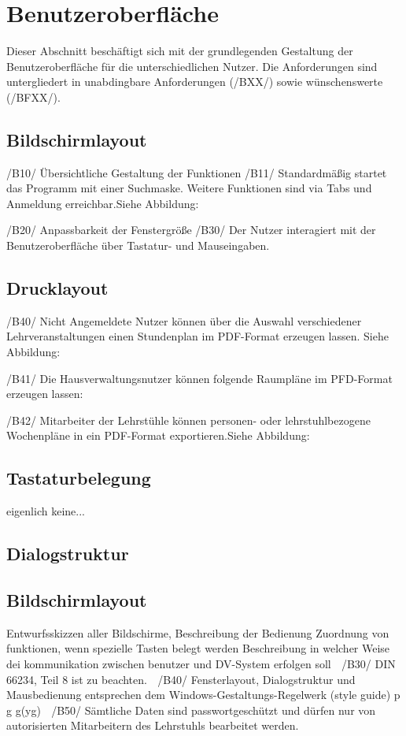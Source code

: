 \section{Benutzeroberfläche}
\label{sec:Benutzeroberfläche}

Dieser Abschnitt beschäftigt sich mit der grundlegenden Gestaltung der Benutzeroberfläche für die unterschiedlichen Nutzer. Die Anforderungen sind untergliedert in unabdingbare Anforderungen (/BXX/) sowie wünschenswerte (/BFXX/).
\subsection{Bildschirmlayout}
/B10/ Übersichtliche Gestaltung der Funktionen
/B11/ Standardmäßig startet das Programm mit einer Suchmaske. Weitere Funktionen sind via Tabs und Anmeldung erreichbar.Siehe Abbildung:

/B20/ Anpassbarkeit der Fenstergröße
/B30/ Der Nutzer interagiert mit der Benutzeroberfläche über Tastatur- und Mauseingaben.
\subsection{Drucklayout}
/B40/ Nicht Angemeldete Nutzer können über die Auswahl verschiedener Lehrveranstaltungen einen Stundenplan im PDF-Format erzeugen lassen. Siehe Abbildung:

/B41/ Die Hausverwaltungsnutzer können folgende Raumpläne im PFD-Format erzeugen lassen:

/B42/ Mitarbeiter der Lehrstühle können personen- oder lehrstuhlbezogene Wochenpläne in ein PDF-Format exportieren.Siehe Abbildung:
 
\subsection{Tastaturbelegung}
eigenlich keine...
\subsection{Dialogstruktur}
\subsection{Bildschirmlayout}

Entwurfsskizzen aller Bildschirme, Beschreibung der Bedienung
Zuordnung von funktionen, wenn spezielle Tasten belegt werden
Beschreibung in welcher Weise dei kommunikation zwischen benutzer und DV-System erfolgen soll
 /B30/ DIN 66234, Teil 8 ist zu beachten.
 /B40/ Fensterlayout, Dialogstruktur und Mausbedienung 
entsprechen dem Windows-Gestaltungs-Regelwerk (style guide) p g g(yg)
 /B50/ Sämtliche Daten sind passwortgeschützt und dürfen nur 
von autorisierten Mitarbeitern des Lehrstuhls bearbeitet werden.